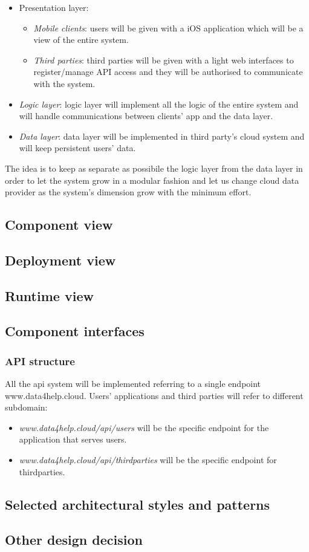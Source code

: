 \documentclass[DD.tex]{subfiles}
\begin{document}
\begin{itemize}
	\item Presentation layer:\begin{itemize}
			\item \textit{Mobile clients}: users will be given with a iOS application which will be a view of the entire system.
			\item \textit{Third parties}: third parties will be given with a light web interfaces to register/manage API access and they will be authorised to communicate with the system.
			\end{itemize}
	\item \textit{Logic layer}: logic layer will implement all the logic of the entire system and will handle communications between clients' app and the data layer.
	\item \textit{Data layer}: data layer will be implemented in third party's cloud system and will keep persistent users' data.
\end{itemize}

The idea is to keep as separate as possibile the logic layer from the data layer in order to let the system grow in a modular fashion and let us change cloud data provider as the system's dimension grow with the minimum effort.

\subsection{Component view}
\subsection{Deployment view}
\subsection{Runtime view}
\subsection{Component interfaces}
\subsubsection{API structure}

All the api system will be implemented referring to a single endpoint www.data4help.cloud. Users' applications and third parties will refer to different subdomain:

\begin{itemize}
	\item \textit{www.data4help.cloud/api/users} will be the specific endpoint for the application that serves users.
	\item \textit{www.data4help.cloud/api/thirdparties} will be the specific endpoint for thirdparties.
\end{itemize}


\subsection{Selected architectural styles and patterns}
\subsection{Other design decision}
\end{document}
